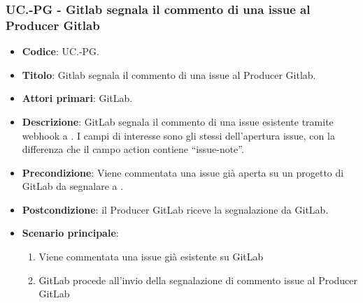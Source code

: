 \subsubsection{UC\theuccount.\thesubuccount-PG - Gitlab segnala il commento di una issue al Producer Gitlab}
\begin{itemize}
    \item \textbf{Codice}: UC\theuccount.\thesubuccount-PG.
    \item \textbf{Titolo}: Gitlab segnala il commento di una issue al Producer Gitlab.
    \item \textbf{Attori primari}: GitLab.
    \item \textbf{Descrizione}: GitLab segnala il commento di una issue esistente tramite webhook a \progetto.
    I campi di interesse sono gli stessi dell'apertura issue, con la differenza che il campo action contiene ``issue-note''.
    \item \textbf{Precondizione}: Viene commentata una issue già aperta su un
    progetto di GitLab da segnalare a \progetto.
    \item \textbf{Postcondizione}: il Producer GitLab riceve la segnalazione da GitLab.
    \item \textbf{Scenario principale}:
    \begin{enumerate}
        \item Viene commentata una issue già esistente su GitLab
        \item GitLab procede all'invio della segnalazione di commento issue al Producer GitLab
    \end{enumerate}

\end{itemize}


